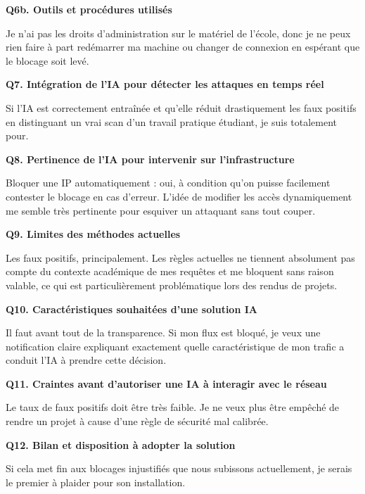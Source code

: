 \documentclass[12pt,a4paper]{article}
\begin{document}
\bigskip
\textbf{Q6b. Outils et proc\'{e}dures utilis\'{e}s}

Je n'ai pas les droits d'administration sur le mat\'{e}riel de l'\'{e}cole, donc je ne peux rien faire \`{a}
part red\'{e}marrer ma machine ou changer de connexion en esp\'{e}rant que le blocage soit lev\'{e}.

\bigskip
\textbf{Q7. Int\'{e}gration de l'IA pour d\'{e}tecter les attaques en temps r\'{e}el}

Si l'IA est correctement entra\^{i}n\'{e}e et qu'elle r\'{e}duit drastiquement les faux positifs en
distinguant un vrai scan d'un travail pratique \'{e}tudiant, je suis totalement pour.

\bigskip
\textbf{Q8. Pertinence de l'IA pour intervenir sur l'infrastructure}

Bloquer une IP automatiquement : oui, \`{a} condition qu'on puisse facilement contester le blocage
en cas d'erreur. L'id\'{e}e de modifier les acc\`{e}s dynamiquement me semble tr\`{e}s pertinente pour
esquiver un attaquant sans tout couper.

\bigskip
\textbf{Q9. Limites des m\'{e}thodes actuelles}

Les faux positifs, principalement. Les r\`{e}gles actuelles ne tiennent absolument pas compte du
contexte acad\'{e}mique de mes requ\^{e}tes et me bloquent sans raison valable, ce qui est
particuli\`{e}rement probl\'{e}matique lors des rendus de projets.

\bigskip
\textbf{Q10. Caract\'{e}ristiques souhait\'{e}es d'une solution IA}

Il faut avant tout de la transparence. Si mon flux est bloqu\'{e}, je veux une notification claire
expliquant exactement quelle caract\'{e}ristique de mon trafic a conduit l'IA \`{a} prendre cette
d\'{e}cision.

\bigskip
\textbf{Q11. Craintes avant d'autoriser une IA \`{a} interagir avec le r\'{e}seau}

Le taux de faux positifs doit \^{e}tre tr\`{e}s faible. Je ne veux plus \^{e}tre emp\^{e}ch\'{e} de rendre un
projet \`{a} cause d'une r\`{e}gle de s\'{e}curit\'{e} mal calibr\'{e}e.

\bigskip
\textbf{Q12. Bilan et disposition \`{a} adopter la solution}

Si cela met fin aux blocages injustifi\'{e}s que nous subissons actuellement, je serais le premier
\`{a} plaider pour son installation.

\clearpage

\end{document}
